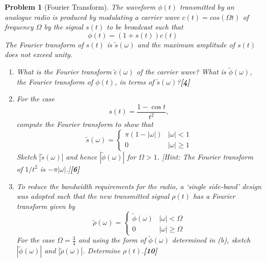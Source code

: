 \documentclass[a4paper]{article}
\theoremstyle{new}
\newtheorem{qns}{Problem}[section]
\begin{document}
\newpage
\begin{qns}[Fourier Transform]
The waveform $\phi(t)$ transmitted by an analogue radio is produced by modulating a carrier wave $c(t) = cos(\Omega t)$ of frequency $\Omega$ by the signal $s(t)$ to be broadcast such that
$$\phi(t) = (1 +s(t))c(t)$$
The Fourier transform of $s(t)$ is $\tilde{s}(\omega)$ and the maximum amplitude of $s(t)$ does not exceed unity.
\begin{enumerate}[label=(\alph*)]
\item What is the Fourier transform $\tilde{c}(\omega)$ of the carrier wave? What is $\tilde{\phi}(\omega)$, the Fourier transform of $\phi(t)$, in terms of $\tilde{s}(\omega)$?\hfill\textbf{[4]}
\item For the case
$$s(t)=\frac{1-\cos t}{t^2},$$
compute the Fourier transform to show that
$$\tilde{s}(\omega)=
\left\{
        \begin{array}{ll}
      \pi(1-|\omega|) & |\omega|<1 \\
      0 & |\omega|\geq1
        \end{array}
    \right.$$
Sketch $|\tilde{s}(\omega)|$ and hence $|\tilde{\phi}(\omega)|$ for $\Omega>1$. [Hint: The Fourier transform of $1/t^2$ is $-\pi|\omega|$.]\hfill\textbf{[6]}
\item To reduce the bandwidth requirements for the radio, a ‘single side-band’ design was adopted such that the new transmitted signal $\rho(t)$ has a Fourier transform given by
$$\tilde{\rho}(\omega)=
\left\{
        \begin{array}{ll}
      \tilde{\phi}(\omega) & |\omega|<\Omega \\
      0 & |\omega|\geq\Omega
        \end{array}
    \right.$$
For the case $\Omega=\frac{3}{4}$ and using the form of $\tilde{\phi}(\omega)$ determined in (b), sketch $|\tilde{\phi}(\omega)|$ and $|\tilde{\rho}(\omega)|$. Determine $\rho(t)$.\hfill\textbf{[10]}
\end{enumerate}
\end{qns}
\end{document}
